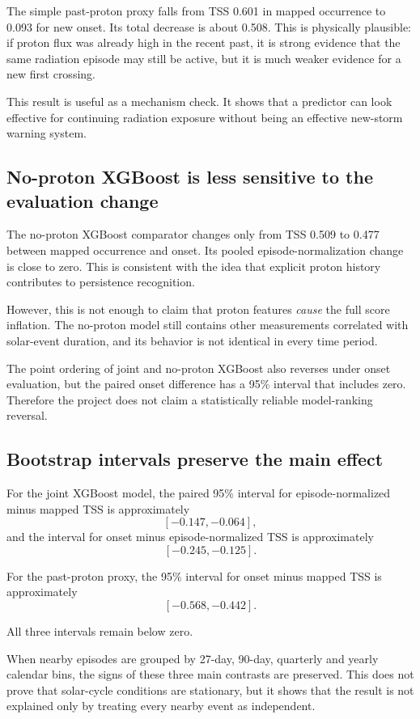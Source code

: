 \documentclass[11pt]{article}
\begin{document}
The simple past-proton proxy falls from TSS 0.601 in mapped occurrence to 0.093 for new onset. Its total decrease is about 0.508. This is physically plausible: if proton flux was already high in the recent past, it is strong evidence that the same radiation episode may still be active, but it is much weaker evidence for a new first crossing.

This result is useful as a mechanism check. It shows that a predictor can look effective for continuing radiation exposure without being an effective new-storm warning system.

\subsection{No-proton XGBoost is less sensitive to the evaluation change}

The no-proton XGBoost comparator changes only from TSS 0.509 to 0.477 between mapped occurrence and onset. Its pooled episode-normalization change is close to zero. This is consistent with the idea that explicit proton history contributes to persistence recognition.

However, this is not enough to claim that proton features \emph{cause} the full score inflation. The no-proton model still contains other measurements correlated with solar-event duration, and its behavior is not identical in every time period.

The point ordering of joint and no-proton XGBoost also reverses under onset evaluation, but the paired onset difference has a 95\% interval that includes zero. Therefore the project does not claim a statistically reliable model-ranking reversal.

\subsection{Bootstrap intervals preserve the main effect}

For the joint XGBoost model, the paired 95\% interval for episode-normalized minus mapped TSS is approximately
\[
[-0.147,-0.064],
\]
and the interval for onset minus episode-normalized TSS is approximately
\[
[-0.245,-0.125].
\]

For the past-proton proxy, the 95\% interval for onset minus mapped TSS is approximately
\[
[-0.568,-0.442].
\]

All three intervals remain below zero.

When nearby episodes are grouped by 27-day, 90-day, quarterly and yearly calendar bins, the signs of these three main contrasts are preserved. This does not prove that solar-cycle conditions are stationary, but it shows that the result is not explained only by treating every nearby event as independent.
\end{document}
